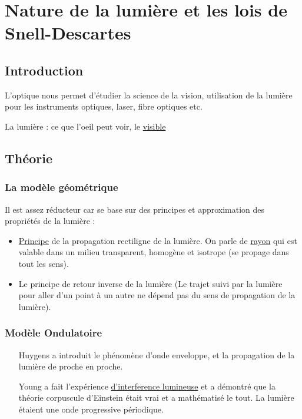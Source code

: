 \chapter{Nature de la lumière et les lois de Snell-Descartes}
\section{Introduction} L'optique nous permet d'étudier la science de la vision, utilisation de la lumière pour les instruments optiques, laser, fibre optiques etc.

La lumière : ce que l'oeil peut voir, le \ul{visible}

\section{Théorie}

\begin{wrapfigure}[6]{r}{0pt}
\end{wrapfigure}
\subsection{La modèle géométrique}

Il est assez réducteur car se base sur des principes et approximation des propriétés de la lumière :
\begin{itemize}
	\item \ul{Principe} de la propagation rectiligne de la lumière. On parle de \ul{rayon} qui est valable dans un milieu transparent, homogène et isotrope (se propage dans tout les sens).
	\item Le principe de retour inverse de la lumière (Le trajet suivi par la lumière pour aller d'un point à un autre ne dépend pas du sens de propagation de la lumière). 
\end{itemize}

\subsection{Modèle Ondulatoire}

\begin{itemize}
	\item[Huygens] a introduit le phénomène d'onde enveloppe, et la propagation de la lumière de proche en proche.
	\item[Young] a fait l'expérience \ul{d'interference lumineuse} et a démontré que la théorie corpuscule d'Einstein était vrai et a mathématisé le tout. La lumière étaient une onde progressive périodique.
\end{itemize}

